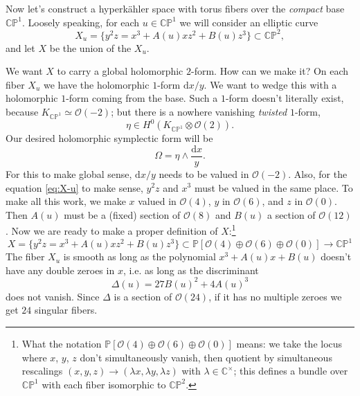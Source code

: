 \documentclass[12pt,letterpaper,reqno]{article}
\numberwithin{equation}{section}
\newcommand{\cO}{\ensuremath{\mathcal O}}
\newcommand{\C}{\ensuremath{\mathbb C}}
\newcommand{\PP}{\ensuremath{\mathbb P}}
\newcommand{\hk}{hyperk\"ahler\xspace}
\newcommand{\de}{\mathrm{d}}
\newcommand{\ti}[1]{\textit{#1}}
\begin{document}
\begin{example} \label{exa:elliptically-fibered-k3}
Now let's construct a \hk space with torus fibers over the \ti{compact}
base $\C\PP^1$. Loosely speaking, for each $u \in \C\PP^1$ we will consider
an elliptic curve
\begin{equation} \label{eq:X-u}
  X_u = \{ y^2 z = x^3 + A(u) xz^2 + B(u) z^3 \} \subset \C\PP^2,
\end{equation}
and let $X$ be the union of the $X_u$.

We want $X$ to carry a global holomorphic $2$-form. How can we make it?
On each fiber $X_u$ we have the holomorphic $1$-form $\de x / y$.
We want to wedge this with
a holomorphic $1$-form coming from the base. Such a $1$-form
doesn't literally exist, because $K_{\C\PP^1} \simeq \cO(-2)$; but there is
a nowhere vanishing \ti{twisted} $1$-form,
\begin{equation}
  \eta \in H^0(K_{\C\PP^1} \otimes \cO(2)).
\end{equation}
Our desired holomorphic symplectic form will be
\begin{equation}
  \Omega = \eta \wedge \frac{\de x}{y}.
\end{equation}
For this to make global sense, $\de x/y$ needs to be
valued in $\cO(-2)$. Also, for the equation \eqref{eq:X-u}
to make sense, $y^2 z$ and $x^3$ must be valued in the same place.
To make all this work, we make $x$ valued in $\cO(4)$, $y$ in $\cO(6)$,
and $z$ in $\cO(0)$. Then $A(u)$ must be a (fixed) section of $\cO(8)$
and $B(u)$ a section of $\cO(12)$.
Now we are ready to make a proper definition of $X$:\footnote{What the notation $\PP[\cO(4) \oplus \cO(6) \oplus \cO(0)]$ means: we take the locus where $x$, $y$, $z$ don't
simultaneously vanish, then quotient by simultaneous rescalings
$(x,y,z) \to (\lambda x, \lambda y, \lambda z)$ with $\lambda \in \C^\times$;
this defines a bundle over $\C\PP^1$ with each fiber isomorphic to $\C\PP^2$.}
\begin{equation}
  X = \{ y^2 z = x^3 + A(u) xz^2 + B(u) z^3 \} \subset \PP[\cO(4) \oplus \cO(6) \oplus \cO(0)] \to \C\PP^1
\end{equation}
The fiber $X_{u}$ is smooth as long as the polynomial
$x^3 + A(u) x + B(u)$ doesn't have any double zeroes in $x$,
i.e. as long as the discriminant
\begin{equation}
  \Delta(u) = 27 B(u)^2 + 4 A(u)^3
\end{equation}
does not vanish. Since $\Delta$ is a section of $\cO(24)$,
if it has no multiple zeroes we get $24$ singular fibers.

\end{example}
\end{document}
